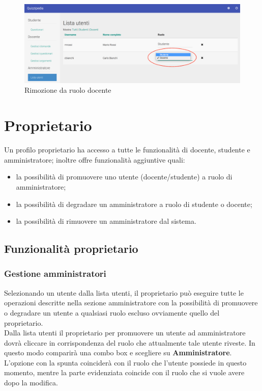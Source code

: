 \documentclass[12pt,a4paper]{article}
\begin{document}
		\begin{figure}[H]
			\centering
			\includegraphics[width=1\linewidth]{../img/screenshot/cambioRuoloDocStud.png}
			\caption{Rimozione da ruolo docente}
			\label{Rimozione da ruolo docente}
		\end{figure}
	
	\section{Proprietario} 
	\par Un profilo proprietario ha accesso a tutte le funzionalità di docente, studente e amministratore; inoltre offre funzionalità aggiuntive quali: \\
	\begin{itemize}
		\item la possibilità di promuovere uno utente (docente/studente) a ruolo di amministratore;
		\item la possibilità di degradare un amministratore a ruolo di studente o docente;
		\item la possibilità di rimuovere un amministratore dal sistema.
	\end{itemize}
	\subsection{Funzionalità proprietario}
	
	\subsubsection{Gestione  amministratori}
	\par Selezionando un utente dalla lista utenti, il proprietario può eseguire tutte le operazioni descritte nella sezione amministratore con la possibilità di promuovere o degradare un utente a qualsiasi ruolo escluso ovviamente quello del proprietario. \\
	
	Dalla lista utenti il proprietario per promuovere un utente ad amministratore dovrà cliccare in corrispondenza del ruolo che attualmente tale utente riveste. In questo modo comparirà una combo box e scegliere su \textbf{Amministratore}. L'opzione con la spunta coinciderà con il ruolo che l'utente possiede in questo momento, mentre la parte evidenziata coincide con il ruolo che si vuole avere dopo la modifica.
	
\end{document}
